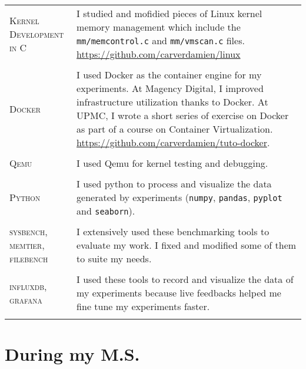 \begin{tabular}{p{2cm}|p{11cm}}

\textsc{Kernel \newline Development in C} & I studied and mofidied pieces of Linux kernel memory management which include the \texttt{mm/memcontrol.c} and \texttt{mm/vmscan.c} files. \href{https://github.com/carverdamien/linux}{https://github.com/carverdamien/linux}\\
\multicolumn{2}{c}{} \\

\textsc{Docker} & I used Docker as the container engine for my experiments. At Magency Digital, I improved infrastructure utilization thanks to Docker. At UPMC, I wrote a short series of exercise on Docker as part of a course on Container Virtualization. \href{https://github.com/carverdamien/tuto-docker}{https://github.com/carverdamien/tuto-docker}.\\
\multicolumn{2}{c}{} \\

\textsc{Qemu} & I used Qemu for kernel testing and debugging.\\
\multicolumn{2}{c}{} \\

\textsc{Python} & I used python to process and visualize the data generated by experiments (\texttt{numpy}, \texttt{pandas}, \texttt{pyplot} and \texttt{seaborn}).\\
\multicolumn{2}{c}{} \\

\textsc{sysbench, memtier, filebench} &  I extensively used these benchmarking tools to evaluate my work. I fixed and modified some of them to suite my needs.\\
\multicolumn{2}{c}{} \\

\textsc{influxdb, grafana} & I used these tools to record and visualize the data of my experiments because live feedbacks helped me fine tune my experiments faster.\\
\multicolumn{2}{c}{} \\

\end{tabular}

\section{During my M.S.}

